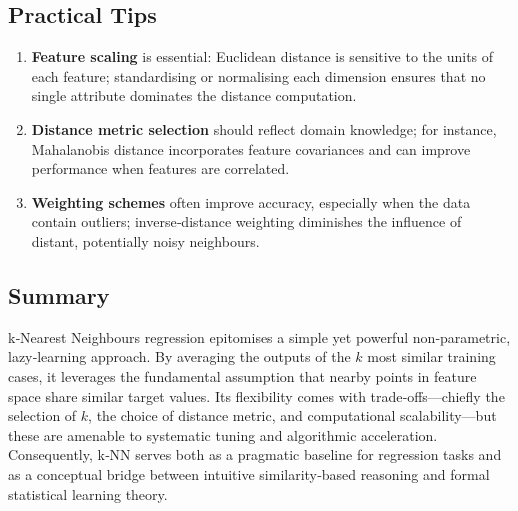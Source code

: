 \documentclass[12pt, a4paper]{article}
\begin{document}
\subsection{Practical Tips}
\begin{enumerate}
  \item \textbf{Feature scaling} is essential: Euclidean distance is sensitive to the units of each feature; standardising or normalising each dimension ensures that no single attribute dominates the distance computation.
  \item \textbf{Distance metric selection} should reflect domain knowledge; for instance, Mahalanobis distance incorporates feature covariances and can improve performance when features are correlated.
  \item \textbf{Weighting schemes} often improve accuracy, especially when the data contain outliers; inverse‑distance weighting diminishes the influence of distant, potentially noisy neighbours.
\end{enumerate}

\subsection{Summary}
k‑Nearest Neighbours regression epitomises a simple yet powerful non‑parametric, lazy‑learning approach.  By averaging the outputs of the \(k\) most similar training cases, it leverages the fundamental assumption that nearby points in feature space share similar target values.  Its flexibility comes with trade‑offs—chiefly the selection of \(k\), the choice of distance metric, and computational scalability—but these are amenable to systematic tuning and algorithmic acceleration.  Consequently, k‑NN serves both as a pragmatic baseline for regression tasks and as a conceptual bridge between intuitive similarity‑based reasoning and formal statistical learning theory.
\end{document}

